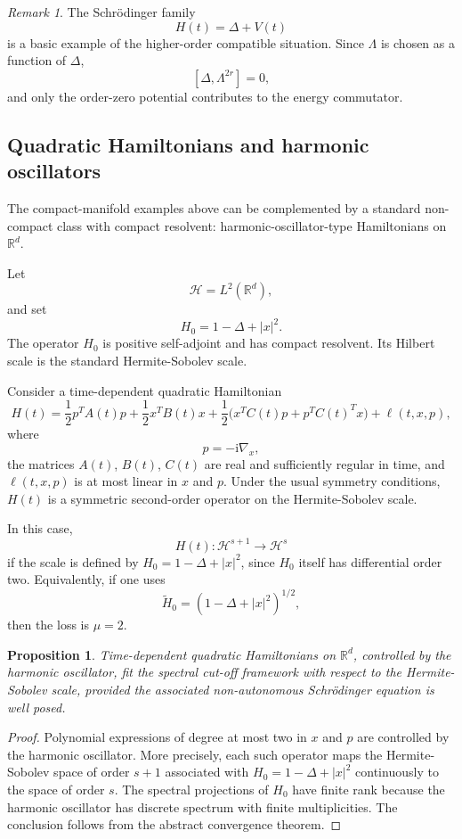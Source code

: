 \documentclass[11pt]{amsart}
\theoremstyle{plain}
\newtheorem{proposition}[theorem]{Proposition}
\theoremstyle{definition}
\theoremstyle{remark}
\newtheorem{remark}[theorem]{Remark}
\newcommand{\Hilb}{\mathcal H}
\newcommand{\ii}{\mathrm i}
\begin{document}
\begin{remark}
\label{rem:schrodinger-compatible-higher-order}
The Schrödinger family
\[
H(t)=\Delta+V(t)
\]
is a basic example of the higher-order compatible situation. Since
\(\Lambda\) is chosen as a function of \(\Delta\),
\[
[\Delta,\Lambda^{2r}]=0,
\]
and only the order-zero potential contributes to the energy commutator.
\end{remark}

\subsection{Quadratic Hamiltonians and harmonic oscillators}

The compact-manifold examples above can be complemented by a standard
non-compact class with compact resolvent: harmonic-oscillator-type
Hamiltonians on \(\mathbb R^d\).

Let
\[
        \Hilb=L^2(\mathbb R^d),
\]
and set
\[
        H_0=1-\Delta+|x|^2.
\]
The operator \(H_0\) is positive self-adjoint and has compact resolvent.
Its Hilbert scale is the standard Hermite-Sobolev scale.

Consider a time-dependent quadratic Hamiltonian
\[
        H(t)
        =
        \frac12 p^TA(t)p
        +
        \frac12 x^TB(t)x
        +
        \frac12\bigl(x^TC(t)p+p^TC(t)^Tx\bigr)
        +
        \ell(t,x,p),
\]
where
\[
        p=-\ii\nabla_x,
\]
the matrices \(A(t)\), \(B(t)\), \(C(t)\) are real and sufficiently
regular in time, and \(\ell(t,x,p)\) is at most linear in \(x\) and
\(p\).  Under the usual symmetry conditions, \(H(t)\) is a symmetric
second-order operator on the Hermite-Sobolev scale.

In this case,
\[
        H(t):\Hilb^{s+1}\to\Hilb^s
\]
if the scale is defined by \(H_0=1-\Delta+|x|^2\), since \(H_0\) itself
has differential order two.  Equivalently, if one uses
\[
        \widetilde H_0=(1-\Delta+|x|^2)^{1/2},
\]
then the loss is \(\mu=2\).

\begin{proposition}
Time-dependent quadratic Hamiltonians on \(\mathbb R^d\), controlled by
the harmonic oscillator, fit the spectral cut-off framework with
respect to the Hermite-Sobolev scale, provided the associated
non-autonomous Schr\"odinger equation is well posed.
\end{proposition}

\begin{proof}
Polynomial expressions of degree at most two in \(x\) and \(p\) are
controlled by the harmonic oscillator.  More precisely, each such
operator maps the Hermite-Sobolev space of order \(s+1\) associated
with \(H_0=1-\Delta+|x|^2\) continuously to the space of order \(s\).
The spectral projections of \(H_0\) have finite rank because the
harmonic oscillator has discrete spectrum with finite multiplicities.
The conclusion follows from the abstract convergence theorem.
\end{proof}
\end{document}
